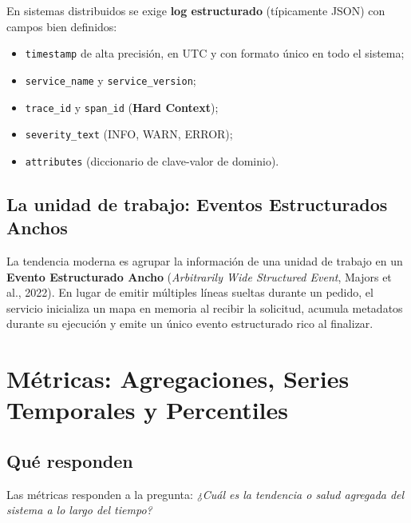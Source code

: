 \documentclass[variant=apuntes,cover=institutional,mode=screen]{ua-engineering-v6-article}
\begin{document}
En sistemas distribuidos se exige \textbf{log estructurado} (típicamente JSON) con campos bien definidos:
\begin{itemize}
\item \texttt{timestamp} de alta precisión, en UTC y con formato único en todo el sistema;
\item \texttt{service\_name} y \texttt{service\_version};
\item \texttt{trace\_id} y \texttt{span\_id} (\textbf{Hard Context});
\item \texttt{severity\_text} (INFO, WARN, ERROR);
\item \texttt{attributes} (diccionario de clave-valor de dominio).
\end{itemize}

\subsection{La unidad de trabajo: Eventos Estructurados Anchos}
La tendencia moderna es agrupar la información de una unidad de trabajo en un \textbf{Evento Estructurado Ancho} (\emph{Arbitrarily Wide Structured Event}, Majors et al., 2022). En lugar de emitir múltiples líneas sueltas durante un pedido, el servicio inicializa un mapa en memoria al recibir la solicitud, acumula metadatos durante su ejecución y emite un único evento estructurado rico al finalizar.

\section{Métricas: Agregaciones, Series Temporales y Percentiles}

\subsection{Qué responden}
Las métricas responden a la pregunta: \emph{¿Cuál es la tendencia o salud agregada del sistema a lo largo del tiempo?}
\end{document}
